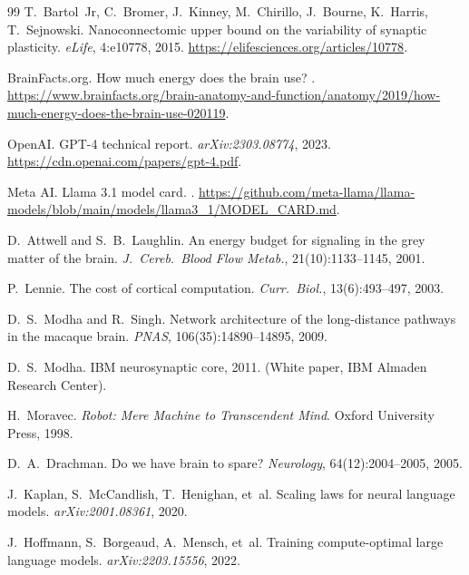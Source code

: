 \documentclass[11pt]{article}
\theoremstyle{definition}
\theoremstyle{remark}
\begin{document}

\begin{thebibliography}{99}
T.~Bartol~Jr, C.~Bromer, J.~Kinney, M.~Chirillo, J.~Bourne, K.~Harris,
  T.~Sejnowski.
\newblock Nanoconnectomic upper bound on the variability of synaptic
  plasticity.
\newblock \emph{eLife}, 4:e10778, 2015.
\newblock \url{https://elifesciences.org/articles/10778}.

BrainFacts.org.
\newblock How much energy does the brain use?
.
\newblock \url{https://www.brainfacts.org/brain-anatomy-and-function/anatomy/2019/how-much-energy-does-the-brain-use-020119}.

OpenAI.
\newblock GPT-4 technical report.
\newblock \emph{arXiv:2303.08774}, 2023.
\newblock \url{https://cdn.openai.com/papers/gpt-4.pdf}.

Meta AI.
\newblock Llama 3.1 model card.
.
\newblock \url{https://github.com/meta-llama/llama-models/blob/main/models/llama3_1/MODEL_CARD.md}.

D.~Attwell and S.~B.~Laughlin.
\newblock An energy budget for signaling in the grey matter of the brain.
\newblock \emph{J.~Cereb.~Blood Flow Metab.}, 21(10):1133--1145, 2001.

P.~Lennie.
\newblock The cost of cortical computation.
\newblock \emph{Curr.~Biol.}, 13(6):493--497, 2003.

D.~S.~Modha and R.~Singh.
\newblock Network architecture of the long-distance pathways in the
  macaque brain.
\newblock \emph{PNAS}, 106(35):14890--14895, 2009.

D.~S.~Modha.
\newblock IBM neurosynaptic core, 2011.
\newblock (White paper, IBM Almaden Research Center).

H.~Moravec.
\newblock \emph{Robot: Mere Machine to Transcendent Mind}.
\newblock Oxford University Press, 1998.

D.~A.~Drachman.
\newblock Do we have brain to spare?
\newblock \emph{Neurology}, 64(12):2004--2005, 2005.

J.~Kaplan, S.~McCandlish, T.~Henighan, et~al.
\newblock Scaling laws for neural language models.
\newblock \emph{arXiv:2001.08361}, 2020.

J.~Hoffmann, S.~Borgeaud, A.~Mensch, et~al.
\newblock Training compute-optimal large language models.
\newblock \emph{arXiv:2203.15556}, 2022.


\end{thebibliography}
\end{document}
